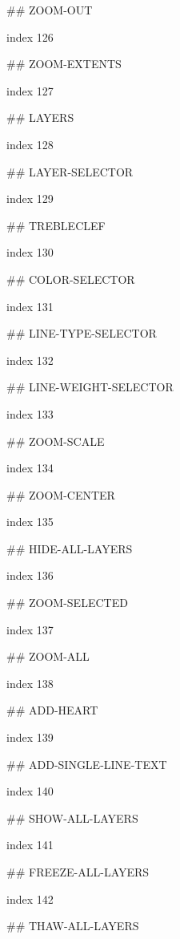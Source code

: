 ## ZOOM-OUT

index 126



## ZOOM-EXTENTS

index 127



## LAYERS

index 128



## LAYER-SELECTOR

index 129



## TREBLECLEF

index 130



## COLOR-SELECTOR

index 131



## LINE-TYPE-SELECTOR

index 132



## LINE-WEIGHT-SELECTOR

index 133



## ZOOM-SCALE

index 134



## ZOOM-CENTER

index 135



## HIDE-ALL-LAYERS

index 136



## ZOOM-SELECTED

index 137



## ZOOM-ALL

index 138



## ADD-HEART

index 139



## ADD-SINGLE-LINE-TEXT

index 140



## SHOW-ALL-LAYERS

index 141



## FREEZE-ALL-LAYERS

index 142



## THAW-ALL-LAYERS

